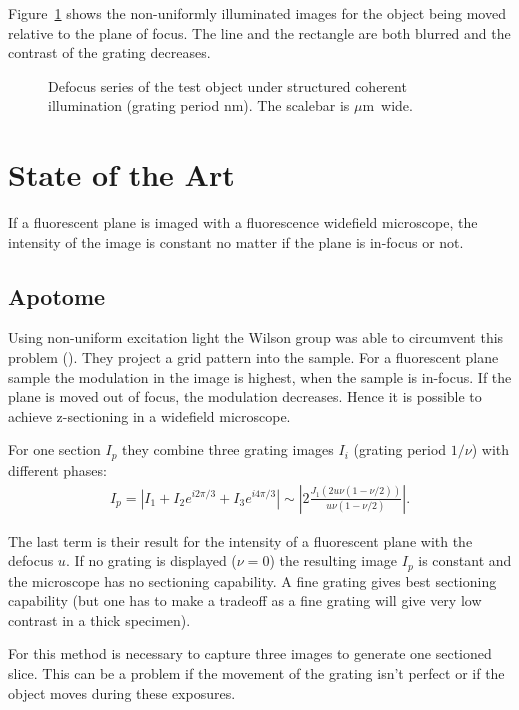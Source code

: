 \documentclass[11pt,abstracton,titlepage]{scrartcl}
\newcommand{\abs}[1]{\left| #1 \right|}
\newcommand{\figref}[1]{Figure~\ref{#1}}
\begin{document}
\figref{fig:defocus} shows the non-uniformly illuminated images for
the object being moved relative to the plane of focus. The line and
the rectangle are both blurred and the contrast of the grating
decreases.
\begin{figure}[htb]
  \centering
  \subfigure[100 nm defocus]{\texttt{[image: in100]}}
  \subfigure[200 nm]{\texttt{[image: in200]}}
  \subfigure[500 nm]{\texttt{[image: in500]}}
  \caption{Defocus series of the test object under structured coherent
    illumination (grating period \unit[600]{nm}). The scalebar is
    \unit[2]{$\mu$m} wide.}
  \label{fig:defocus}
\end{figure}


\section{State of the Art}
If a fluorescent plane is imaged with a fluorescence widefield
microscope, the intensity of the image is constant no matter if the
plane is in-focus or not. 
\subsection{Apotome}
Using non-uniform excitation light the Wilson group was able to
circumvent this problem (\cite{1997Neil}). They project a grid pattern
into the sample. For a fluorescent plane sample the modulation in the
image is highest, when the sample is in-focus. If the plane is moved
out of focus, the modulation decreases. Hence it is possible to achieve
z-sectioning in a widefield microscope.

For one section $I_p$ they combine three grating images $I_i$ (grating
period $1/\nu$) with different phases:
\begin{align}
  I_p=\abs{I_1+I_2e^{i2\pi/3}+I_3e^{i4\pi/3}}
  \sim\abs{ 2 \frac{J_1(2u\nu(1-\nu/2))}{u\nu(1-\nu/2)}}.
\end{align}

The last term is their result for the intensity of a fluorescent plane
with the defocus $u$. If no grating is displayed ($\nu=0$) the
resulting image $I_p$ is constant and the microscope has no sectioning
capability. A fine grating gives best sectioning capability (but one
has to make a tradeoff as a fine grating will give very low contrast
in a thick specimen).

For this method is necessary to capture three images to generate one
sectioned slice. This can be a problem if the movement of the grating
isn't perfect or if the object moves during these exposures.
\end{document}
